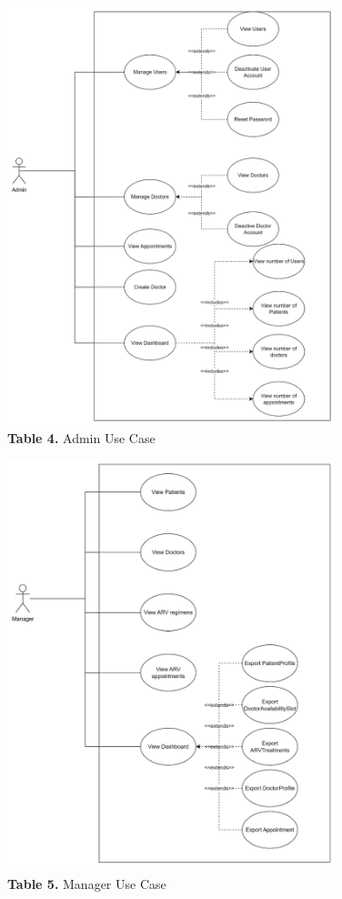 \documentclass[12pt,a4paper]{article}
\begin{document}
\begin{figure}[H]
    \centering
    \includegraphics[width=0.85\textwidth]{diagrams/Picture/Usecase4.png}
    \caption*{\textbf{Table 4.} Admin Use Case}
\end{figure}

\begin{figure}[H]
    \centering
    \includegraphics[width=0.85\textwidth]{diagrams/Picture/Usecase5.png}
    \caption*{\textbf{Table 5.} Manager Use Case}
\end{figure}
\end{document}

